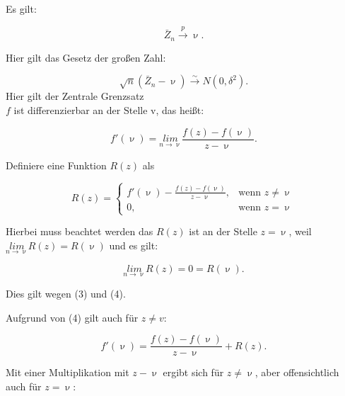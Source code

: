 \documentclass[10pt]{article}
\newcommand{\KW}{\overset{p} \longrightarrow} %
\newcommand{\KV}{\overset{\sim} \longrightarrow} %
\newcommand{\eqname}[1]{\tag*{#1}}%
\newenvironment{BWS}[1][]
{\begin{Beweis}[frametitle=#1]}{\end{Beweis}}
\begin{document}
	
	\begin{BWS}[Beweis 1.3.1 Delta-Methode]
		Es gilt:
		
		
		\begin{equation*}
			\bar{Z}_n \KW \upnu  \eqname{(1)}.
		\end{equation*}
		
		\noindent Hier gilt das Gesetz der großen Zahl:
		
		\begin{equation*}
			\sqrt{n} (\bar{Z}_n - \upnu) \KV N(0,\delta^2) \eqname{(2)}.
		\end{equation*}
		Hier gilt der Zentrale Grenzsatz\\
		
	\noindent	$f$ ist differenzierbar an der Stelle v, das heißt: 
		
		\begin{equation*}
			f'(\upnu) = \underset{n \rightarrow \upnu}{lim} \frac{f(z) - f(\upnu)}{z-\upnu} \eqname{(3)}.
		\end{equation*}
		
		\noindent Definiere eine Funktion $R(z)$ als
		
		\begin{equation*}
			R(z) = \begin{cases} 
				f'(\upnu) - \frac{f(z)- f(\upnu)}{z-\upnu}, &\text{wenn } z \neq \upnu\\
				0, &\text{wenn } z = \upnu
			\end{cases} \eqname{(4)}
		\end{equation*}
		
		\noindent Hierbei muss beachtet werden das $R(z)$ ist an der Stelle $z=\upnu$, weil $\underset{n \rightarrow \upnu} {lim} R(z) = R(\upnu)$ und es gilt:
		
		\begin{equation*}
			\underset{n \rightarrow \upnu} {lim} R(z) = 0 = R(\upnu).
		\end{equation*}
		
		\noindent Dies gilt wegen (3) und (4).
		
		\noindent Aufgrund von (4) gilt auch für $z \neq v$:
		
		\begin{equation*}
			f'(\upnu)=\frac{f(z) - f(\upnu)}{z - \upnu} + R(z).
		\end{equation*}
		
		Mit einer Multiplikation mit $z-\upnu$ ergibt sich für $z \neq \upnu$, aber offensichtlich auch für $z = \upnu$:
		

\end{BWS}
\end{document}
